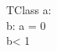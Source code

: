 \documentclass{article}
\begin{document}
\begin{schema}{TClass}
	a: \nat \\
	b: \nat
\where
	a = 0 \\
	b< 1

\end{schema}
\end{document}
